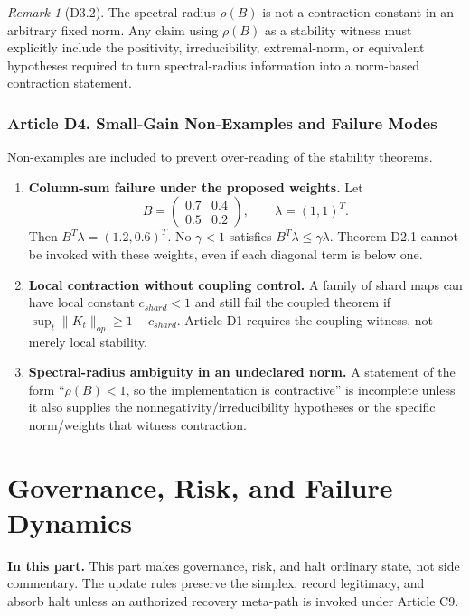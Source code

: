 \documentclass[10pt,oneside]{article}
\theoremstyle{definition}
\theoremstyle{remark}
\newtheorem*{remark}{Remark}
\newcommand{\PartIntro}[1]{\noindent\textbf{In this part.} #1\par\medskip}
\begin{document}
\begin{remark}[D3.2]
The spectral radius \(\rho(B)\) is not a contraction constant in an arbitrary fixed norm. Any claim using \(\rho(B)\) as a stability witness must explicitly include the positivity, irreducibility, extremal-norm, or equivalent hypotheses required to turn spectral-radius information into a norm-based contraction statement.
\end{remark}

\section{Article D4. Small-Gain Non-Examples and Failure Modes}
Non-examples are included to prevent over-reading of the stability theorems.

\begin{enumerate}
  \item \textbf{Column-sum failure under the proposed weights.} Let
  \[
  B=\begin{pmatrix}0.7&0.4\\0.5&0.2\end{pmatrix},\qquad \lambda=(1,1)^T.
  \]
  Then \(B^T\lambda=(1.2,0.6)^T\). No \(\gamma<1\) satisfies \(B^T\lambda\leq \gamma\lambda\). Theorem D2.1 cannot be invoked with these weights, even if each diagonal term is below one.
  \item \textbf{Local contraction without coupling control.} A family of shard maps can have local constant \(c_{shard}<1\) and still fail the coupled theorem if \(\sup_t\lVert K_t\rVert_{op}\geq 1-c_{shard}\). Article D1 requires the coupling witness, not merely local stability.
  \item \textbf{Spectral-radius ambiguity in an undeclared norm.} A statement of the form ``\(\rho(B)<1\), so the implementation is contractive'' is incomplete unless it also supplies the nonnegativity/irreducibility hypotheses or the specific norm/weights that witness contraction.
\end{enumerate}

\part{Governance, Risk, and Failure Dynamics}

\PartIntro{This part makes governance, risk, and halt ordinary state, not side commentary. The update rules preserve the simplex, record legitimacy, and absorb halt unless an authorized recovery meta-path is invoked under Article C9.}
\end{document}
